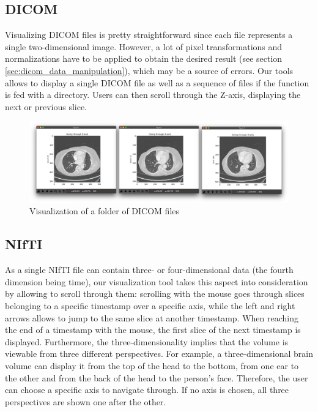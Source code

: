 \subsection{DICOM}
Visualizing DICOM files is pretty straightforward since each file represents a single two-dimensional image. However, a lot of pixel transformations and normalizations have to be applied to obtain the desired result (see section \ref{sec:dicom_data_manipulation}), which may be a source of errors. Our tools allows to display a single DICOM file as well as a sequence of files if the function is fed with a directory. Users can then scroll through the Z-axis, displaying the next or previous slice. 

\begin{figure}[!h]
\centering
\includegraphics[width=\textwidth, keepaspectratio=true]{./figures/visualize_lung_dcm.png}
\caption{Visualization of a folder of DICOM files}
\label{fig:visualize_lung_dcm}
\end{figure}


\subsection{NIfTI}
As a single NIfTI file can contain three- or four-dimensional data (the fourth dimension being time), our visualization tool takes this aspect into consideration by allowing to scroll through them: scrolling with the mouse goes through slices belonging to a specific timestamp over a specific axis, while the left and right arrows allows to jump to the same slice at another timestamp. When reaching the end of a timestamp with the mouse, the first slice of the next timestamp is displayed. Furthermore, the three-dimensionality implies that the volume is viewable from three different perspectives. For example, a three-dimensional brain volume can display it from the top of the head to the bottom, from one ear to the other and from the back of the head to the person's face. Therefore, the user can choose a specific axis to navigate through. If no axis is chosen, all three perspectives are shown one after the other.

